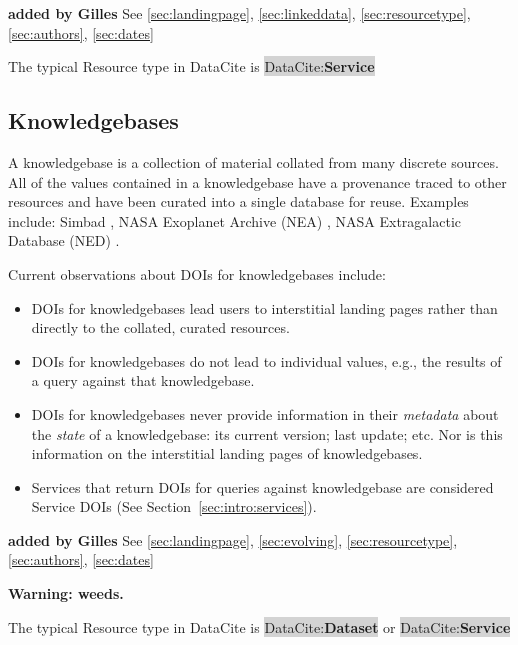 \documentclass[11pt,a4paper]{ivoa}
\newcommand{\dataciteterm}[1]{\colorbox{lightgray}{DataCite:\textbf{#1}}}
\begin{document}
\textbf{\color{red} added by Gilles}
See \ref{sec:landingpage}, \ref{sec:linkeddata}, \ref{sec:resourcetype}, \ref{sec:authors}, \ref{sec:dates}


The typical Resource type in DataCite is \dataciteterm{Service}

\subsection{Knowledgebases}
\label{sec:intro:kdbs}

A knowledgebase is a collection of material collated from many discrete sources.
All of the values contained in a knowledgebase have a provenance traced to other resources and have been curated into a single database for reuse.
Examples include: Simbad \citep[as originally described in, ][]{2000A&AS..143....9W}, NASA Exoplanet Archive (NEA) \citep{NEA12-doi2bib} \citep[as originally described in,][]{2013PASP..125..989A}, NASA Extragalactic Database (NED) \citep{NED1-doi2bib} \citep[as originally described in,][]{1991ASSL..171...89H}. 

Current observations about DOIs for knowledgebases include:


\begin{itemize}
	\item DOIs for knowledgebases lead users to interstitial landing pages rather than directly to the collated, curated resources. 
	\item DOIs for knowledgebases do not lead to individual values, e.g., the results of a query against that knowledgebase.
	\item DOIs for knowledgebases never provide information in their \textit{metadata} about the \textit{state} of a knowledgebase: its current version; last update; etc. 
	Nor is this information on the interstitial landing pages of knowledgebases.
	\item Services that return DOIs for queries against knowledgebase are considered Service DOIs (See Section~\ref{sec:intro:services}).
\end{itemize}

\textbf{\color{red} added by Gilles}
See \ref{sec:landingpage}, \ref{sec:evolving}, \ref{sec:resourcetype}, \ref{sec:authors}, \ref{sec:dates}

\textbf{Warning: weeds.}

The typical Resource type in DataCite is \dataciteterm{Dataset} or \dataciteterm{Service}
\end{document}
